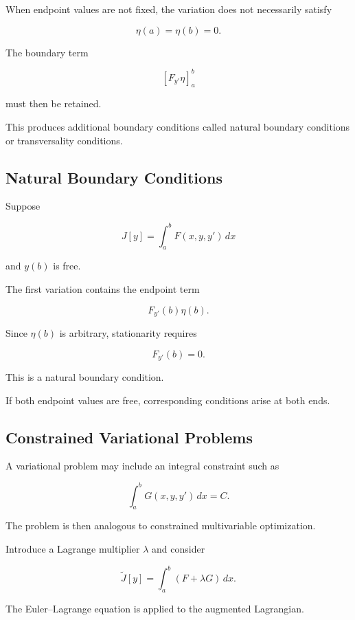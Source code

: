 When endpoint values are not fixed, the variation does not necessarily
satisfy

\[
\eta(a)=\eta(b)=0.
\]

The boundary term

\[
\left[
F_{y'}\eta
\right]_a^b
\]

must then be retained.

This produces additional boundary conditions called natural boundary
conditions or transversality conditions.

\subsection{Natural Boundary Conditions}
\label{subsec:natural-boundary-conditions}

Suppose

\[
J[y]
=
\int_a^b
F(x,y,y')\,dx
\]

and \(y(b)\) is free.

The first variation contains the endpoint term

\[
F_{y'}(b)\eta(b).
\]

Since \(\eta(b)\) is arbitrary, stationarity requires

\[
\boxed{
F_{y'}(b)=0.
}
\]

This is a natural boundary condition.

If both endpoint values are free, corresponding conditions arise at both
ends.

\subsection{Constrained Variational Problems}
\label{subsec:constrained-variational-problems}

A variational problem may include an integral constraint such as

\[
\boxed{
\int_a^b
G(x,y,y')\,dx
=
C.
}
\]

The problem is then analogous to constrained multivariable optimization.

Introduce a Lagrange multiplier \(\lambda\) and consider

\[
\boxed{
\widetilde{J}[y]
=
\int_a^b
\left(
F+\lambda G
\right)\,dx.
}
\]

The Euler--Lagrange equation is applied to the augmented Lagrangian.

